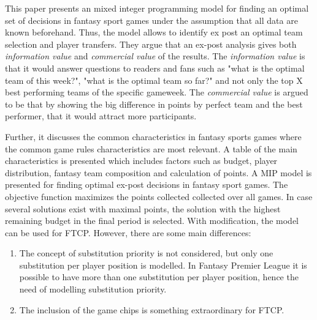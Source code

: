 This paper presents an mixed integer programming model for finding an optimal set of decisions in fantasy sport games under the assumption that all data are known beforehand. Thus, the model allows to identify ex post an optimal team selection and player transfers. They argue that an ex-post analysis gives both \textit{information value} and \textit{commercial value} of the results. The \textit{information value} is that it would answer questions to readers and fans such as "what is the optimal team of this week?", "what is the optimal team so far?" and not only the top X best performing teams of the specific gameweek. The \textit{commercial value} is argued to be that by showing the big difference in points by perfect team and the best performer, that it would attract more participants. 

\newpar

Further, it discusses the common characteristics in fantasy sports games where the common game rules characteristics are most relevant. A table of the main characteristics is presented which includes factors such as budget, player distribution, fantasy team composition and calculation of points. A MIP model is presented for finding optimal ex-post decisions in fantasy sport games. The objective function maximizes the points collected collected over all games. In case several solutions exist with maximal points, the solution with the highest remaining budget in the final period is selected.  With modification, the model can be used for FTCP. However, there are some main differences: 

\begin{enumerate}
    \item The concept of substitution priority is not considered, but only one substitution per player position is modelled. In Fantasy Premier League it is possible to have more than one substitution per player position, hence the need of modelling substitution priority. 
    \item The inclusion of the game chips is something extraordinary for FTCP. 
\end{enumerate}


